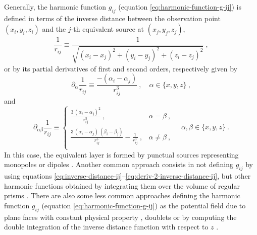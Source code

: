 Generally, the harmonic function $g_{ij}$ (equation \ref{eq:harmonic-function-g-ij}) is defined in terms of the 
inverse distance between the observation point $(x_{i}, y_{i}, z_{i})$ and the $j$-th equivalent source at $(x_{j}, y_{j}, z_{j})$,
\begin{equation}
	\frac{1}{r_{ij}} \equiv \frac{1}{\sqrt{(x_{i} - x_{j})^{2} + (y_{i} - y_{j})^{2} + (z_{i} - z_{j})^{2}}} \: ,
	\label{eq:inverse-distance-ij}
\end{equation}
or by its partial derivatives of first and second orders, respectively given by
\begin{equation}
	\partial_{\alpha} \frac{1}{r_{ij}} \equiv \frac{-(\alpha_{i} - \alpha_{j})}{r_{ij}^{3}} \: ,
	\quad \alpha \in \{ x, y, z \} \: ,
	\label{eq:deriv-1-inverse-distance-ij}
\end{equation}
and
\begin{equation}
	\partial_{\alpha\beta} \frac{1}{r_{ij}} \equiv 
	\begin{cases}
		\frac{3 \, (\alpha_{i} - \alpha_{j})^{2}}{r_{ij}^{5}} \: , &\alpha = \beta \: , \\
		\frac{3 \, (\alpha_{i} - \alpha_{j}) \, (\beta_{i} - \beta_{j})}{r_{ij}^{5}} - \frac{1}{r_{ij}^{3}} \: , &\alpha \ne \beta \: , \\
	\end{cases}
	\quad \alpha, \beta \in \{ x, y, z \} \: .
	\label{eq:deriv-2-inverse-distance-ij}
\end{equation}
In this case, the equivalent layer is formed by punctual sources representing monopoles or dipoles
\cite[e.g.,][]{dampney1969, emilia1973, leao-silva1989, cordell1992, oliveirajr-etal2013, siqueira-etal2017, reis-etal2020, takahashi-etal2020, soler-uieda2021, takahashi-etal2022}.
Another common approach consists in not defining $g_{ij}$ by using equations \ref{eq:inverse-distance-ij}--\ref{eq:deriv-2-inverse-distance-ij},
but other harmonic functions obtained by integrating them over the volume of regular prisms 
\cite[e.g.,][]{li-oldenburg_2010, barnes-lumley_2011, li_etal_2014, jirigalatu-ebbing2019}.
There are also some less common approaches defining the harmonic function $g_{ij}$ (equation \ref{eq:harmonic-function-g-ij})
as the potential field due to plane faces with constant physical property \citep{hansen-miyazaki1984}, doublets \citep{silva1986} or
by computing the double integration of the inverse distance function with respect to $z$ \citep{guspi-novara2009}.

